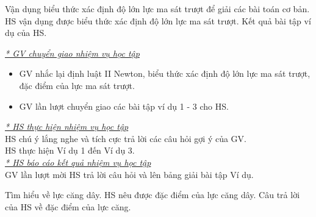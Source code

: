 \hoatdong
{Vận dụng biểu thức xác định độ lớn lực ma sát trượt để giải các bài toán cơ bản.
}
{HS vận dụng được biểu thức xác định độ lớn lực ma sát trượt.
}
{Kết quả bài tập ví dụ của HS.
}
{\textit{\underline{* GV chuyển giao nhiệm vụ học tập}}
	\begin{itemize}[label=-]
		\item GV nhắc lại định luật II Newton, biểu thức xác định độ lớn lực ma sát trượt, đặc điểm của lực ma sát trượt.
		\item GV lần lượt chuyển giao các bài tập ví dụ 1 - 3 cho HS.
	\end{itemize}
	\textit{\underline{* HS thực hiện nhiệm vụ học tập}}\\
	HS chú ý lắng nghe và tích cực trả lời các câu hỏi gợi ý của GV.\\
	HS thực hiện Ví dụ 1 đến Ví dụ 3.\\
	\textit{\underline{* HS báo cáo kết quả nhiệm vụ học tập}}\\
	GV lần lượt mời HS trả lời câu hỏi và lên bảng giải bài tập Ví dụ.
}
\hoatdong
{Tìm hiểu về lực căng dây.
}
{HS nêu được đặc điểm của lực căng dây.
}
{Câu trả lời của HS về đặc điểm của lực căng.
}
